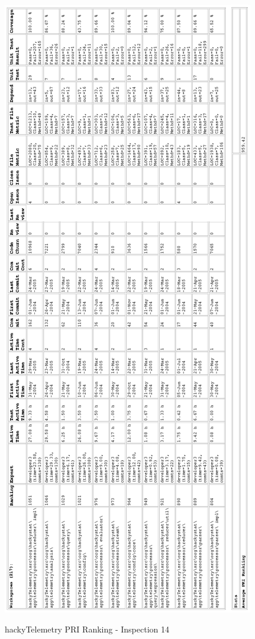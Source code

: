\begin{figure}[!h]
  \centering
  \caption{hackyTelemetry PRI Ranking - Inspection 14}
  \includegraphics[totalheight=1.0\textheight]{figs/Results/14_2005-05-08-hackyTelemetry-printable.eps}
  \label{fig:inspection14-hackyTelemetry-ranking}
\end{figure}





